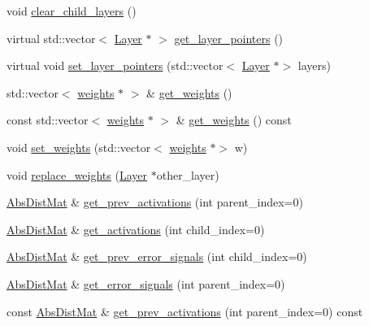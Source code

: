 \begin{DoxyCompactItemize}
\item 
void \hyperlink{classlbann_1_1Layer_a040bf53e261b1ef796739c09b3362a3a}{clear\+\_\+child\+\_\+layers} ()
\item 
virtual std\+::vector$<$ \hyperlink{classlbann_1_1Layer}{Layer} $\ast$ $>$ \hyperlink{classlbann_1_1Layer_a9f94210cbb973f1df89ef649899094a1}{get\+\_\+layer\+\_\+pointers} ()
\item 
virtual void \hyperlink{classlbann_1_1Layer_a001ea76cdd05e2d0d475f408f24702ee}{set\+\_\+layer\+\_\+pointers} (std\+::vector$<$ \hyperlink{classlbann_1_1Layer}{Layer} $\ast$$>$ layers)
\item 
std\+::vector$<$ \hyperlink{classlbann_1_1weights}{weights} $\ast$ $>$ \& \hyperlink{classlbann_1_1Layer_a4ee78d42284421519dd18d27b4da0957}{get\+\_\+weights} ()
\item 
const std\+::vector$<$ \hyperlink{classlbann_1_1weights}{weights} $\ast$ $>$ \& \hyperlink{classlbann_1_1Layer_ab9fe05ad8d21ba5d6dd4d22ee2e0dca0}{get\+\_\+weights} () const
\item 
void \hyperlink{classlbann_1_1Layer_a524a78dc6a812ae92834a9e1aa83434b}{set\+\_\+weights} (std\+::vector$<$ \hyperlink{classlbann_1_1weights}{weights} $\ast$$>$ w)
\item 
void \hyperlink{classlbann_1_1Layer_ae9df4e0b0fe7c276c79575f9e11c53af}{replace\+\_\+weights} (\hyperlink{classlbann_1_1Layer}{Layer} $\ast$other\+\_\+layer)
\item 
\hyperlink{base_8hpp_a9a697a504ae84010e7439ffec862b470}{Abs\+Dist\+Mat} \& \hyperlink{classlbann_1_1Layer_a45853df73a2e72bfaa774665a0f37ed7}{get\+\_\+prev\+\_\+activations} (int parent\+\_\+index=0)
\item 
\hyperlink{base_8hpp_a9a697a504ae84010e7439ffec862b470}{Abs\+Dist\+Mat} \& \hyperlink{classlbann_1_1Layer_a1134b1a4385af199d7272c5aa827fa99}{get\+\_\+activations} (int child\+\_\+index=0)
\item 
\hyperlink{base_8hpp_a9a697a504ae84010e7439ffec862b470}{Abs\+Dist\+Mat} \& \hyperlink{classlbann_1_1Layer_a7ac4579d3c1671dfaf86e3b618d6938a}{get\+\_\+prev\+\_\+error\+\_\+signals} (int child\+\_\+index=0)
\item 
\hyperlink{base_8hpp_a9a697a504ae84010e7439ffec862b470}{Abs\+Dist\+Mat} \& \hyperlink{classlbann_1_1Layer_adb561e140e0bb601f3c5a8ee053a71d2}{get\+\_\+error\+\_\+signals} (int parent\+\_\+index=0)
\item 
const \hyperlink{base_8hpp_a9a697a504ae84010e7439ffec862b470}{Abs\+Dist\+Mat} \& \hyperlink{classlbann_1_1Layer_afc0611b7c3b1537914f25a538486a8cd}{get\+\_\+prev\+\_\+activations} (int parent\+\_\+index=0) const

\end{DoxyCompactItemize}
